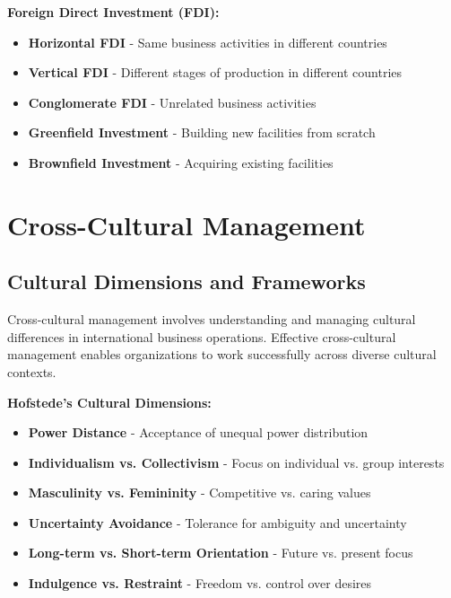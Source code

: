 \documentclass[12pt]{article}
\begin{document}
\textbf{Foreign Direct Investment (FDI):}
\begin{itemize}
    \item \textbf{Horizontal FDI} - Same business activities in different countries
    \item \textbf{Vertical FDI} - Different stages of production in different countries
    \item \textbf{Conglomerate FDI} - Unrelated business activities
    \item \textbf{Greenfield Investment} - Building new facilities from scratch
    \item \textbf{Brownfield Investment} - Acquiring existing facilities
\end{itemize}

\section{Cross-Cultural Management}

\subsection{Cultural Dimensions and Frameworks}
Cross-cultural management involves understanding and managing cultural differences in international business operations. Effective cross-cultural management enables organizations to work successfully across diverse cultural contexts.

\textbf{Hofstede's Cultural Dimensions:}
\begin{itemize}
    \item \textbf{Power Distance} - Acceptance of unequal power distribution
    \item \textbf{Individualism vs. Collectivism} - Focus on individual vs. group interests
    \item \textbf{Masculinity vs. Femininity} - Competitive vs. caring values
    \item \textbf{Uncertainty Avoidance} - Tolerance for ambiguity and uncertainty
    \item \textbf{Long-term vs. Short-term Orientation} - Future vs. present focus
    \item \textbf{Indulgence vs. Restraint} - Freedom vs. control over desires
\end{itemize}
\end{document}
